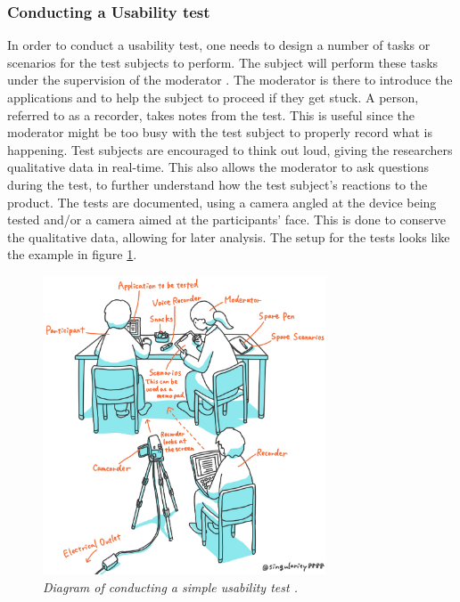 \subsubsection{Conducting a Usability test}

In order to conduct a usability test, one needs to design a number of tasks or scenarios for the test subjects to perform. The subject will perform these tasks under the supervision of the moderator \cite{Brooke2018}. The moderator is there to introduce the applications and to help the subject to proceed if they get stuck. A person, referred to as a recorder, takes notes from the test. This is useful since the moderator might be too busy with the test subject to properly record what is happening. 
Test subjects are encouraged to think out loud, giving the researchers qualitative data in real-time. This also allows the moderator to ask questions during the test, to further understand how the test subject's reactions to the product. 
The tests are documented, using a camera angled at the device being tested and/or a camera aimed at the participants’ face. This is done to conserve the qualitative data, allowing for later analysis. The setup for the tests looks like the example in figure \ref{fig:usability-test-example}.

\begin{figure}[ht]
    \centering 
    \includegraphics[width=0.75\textwidth]{img/usability_test_example.png}
    \hfill
    \caption{\textit{Diagram of conducting a simple usability test \cite{Shingyouchi2019}.  }}
    \label{fig:usability-test-example}
\end{figure}

